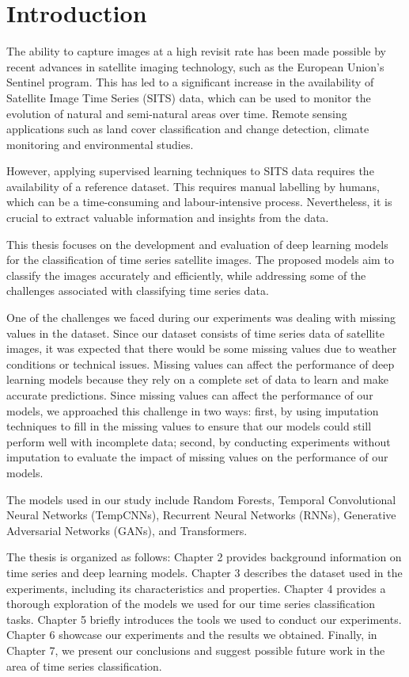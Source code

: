 \chapter{Introduction}


The ability to capture images at a high revisit rate has been made possible by recent advances in satellite imaging technology, such as the European Union's Sentinel program.
This has led to a significant increase in the availability of Satellite Image Time Series (SITS) data, which can be used to monitor the evolution of natural and semi-natural areas over time.
Remote sensing applications such as land cover classification and change detection, climate monitoring and environmental studies.

However, applying supervised learning techniques to SITS data requires the availability of a reference dataset.
This requires manual labelling by humans, which can be a time-consuming and labour-intensive process.
Nevertheless, it is crucial to extract valuable information and insights from the data.


This thesis focuses on the development and evaluation of deep learning models for the classification of time series satellite images.
The proposed models aim to classify the images accurately and efficiently, while addressing some of the challenges associated with classifying time series data.

One of the challenges we faced during our experiments was dealing with missing values in the dataset. 
Since our dataset consists of time series data of satellite images, it was expected that there would be some missing values due to weather conditions or technical issues.
Missing values can affect the performance of deep learning models because they rely on a complete set of data to learn and make accurate predictions.
Since missing values can affect the performance of our models, we approached this challenge in two ways: first, by using imputation techniques to fill in the missing values to ensure that our models could still perform well with incomplete data; second, by conducting experiments without imputation to evaluate the impact of missing values on the performance of our models.

The models used in our study include Random Forests, Temporal Convolutional Neural Networks (TempCNNs), Recurrent Neural Networks (RNNs), Generative Adversarial Networks (GANs), and Transformers.

The thesis is organized as follows: Chapter 2 provides background information on time series and deep learning models.
Chapter 3 describes the dataset used in the experiments, including its characteristics and properties.
Chapter 4 provides a thorough exploration of the models we used for our time series classification tasks.
Chapter 5 briefly introduces the tools we used to conduct our experiments.
Chapter 6 showcase our experiments and the results we obtained.
Finally, in Chapter 7, we present our conclusions and suggest possible future work in the area of time series classification.